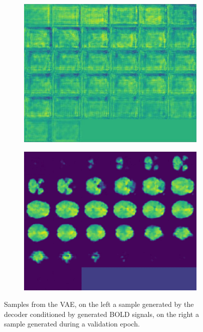 	\begin{figure}[!h]
		\centering
		\begin{subfigure}[b]{0.45\textwidth}
			\centering
			\includegraphics[width=\textwidth]{figures/bad-vae-sample.png}
		\end{subfigure}
		\hfill
		\begin{subfigure}[b]{0.45\textwidth}
			\centering
			\includegraphics[width=\textwidth]{figures/good-vae-sample.jpeg}
		\end{subfigure}
		\caption{Samples from the VAE, on the left a sample generated by the decoder conditioned by generated BOLD signals, on the right a sample generated during a validation epoch.}
		\label{fig:vae-samples}
	\end{figure}
	
